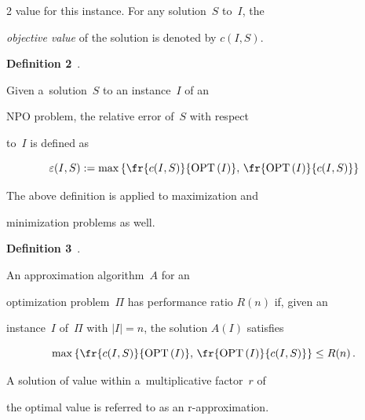 \begin{multicols}{2}
value for this instance. For any solution~$S$ to~$I$, the


\textit{objective value} of the solution is denoted by $c(I,S)$.





\smallskip





\noindent


\textbf{Definition 2}~\cite{TrevisanLuca}.


 Given a~solution~$S$ to an instance~$I$ of an


NPO problem, the relative error of~$S$ with respect


to~$I$ is defined as


$$


\varepsilon(I,S):=\max\left\{\fr{c(I,S)}{\mathrm{OPT}\left(I\right)},\,\fr{\mathrm{OPT}\left(I\right)}{c(I,S)}\right\}


$$


The above definition is applied to maximization and


minimization problems as well.





\smallskip





\noindent


\textbf{Definition 3}~\cite{TrevisanLuca}.


An approximation algorithm~$A$ for an


optimization problem~$\Pi$ has performance ratio $R(n)$ if, given an


instance~$I$ of~$\Pi$ with $|I|=n$, the solution $A(I)$ satisfies





\noindent


$$


\max\left\{\fr{c(I,S)}{\mathrm{OPT}\left(I\right)},\,\fr{\mathrm{OPT}\left(I\right)}{c(I,S)}\right\}


\leq R(n)\,.


$$








 A solution of value within a~multiplicative factor~$r$ of


the optimal value is referred to as an {r-approximation}.






\end{multicols}
